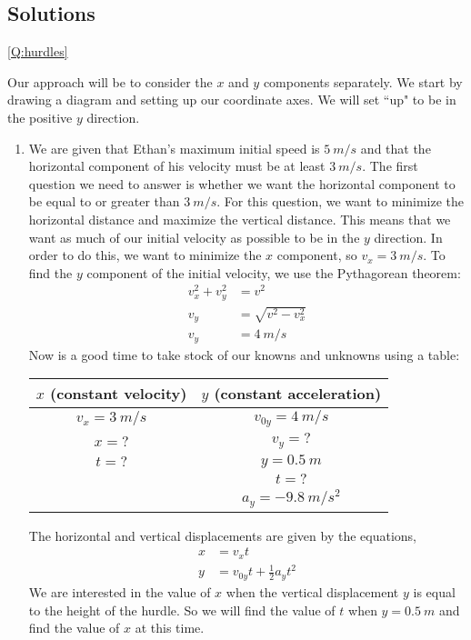 \subsection{Solutions}
\begin{solution}{\ref{Q:hurdles}}{
Our approach will be to consider the $x$ and $y$ components separately. We start by drawing a diagram and setting up our coordinate axes. We will set ``up" to be in the positive $y$ direction.
\begin{enumerate}[label=\alph*)]
\item We are given that Ethan's maximum initial speed is $\SI{5}{m/s}$ and that the horizontal component of his velocity must be at least $\SI{3}{m/s}$. The first question we need to answer is whether we want the horizontal component to be equal to or greater than $\SI{3}{m/s}$. For this question, we want to minimize the horizontal distance and maximize the vertical distance. This means that we want as much of our initial velocity as possible to be in the $y$ direction. In order to do this, we want to minimize the $x$ component, so $v_x=\SI{3}{m/s}$. To find the $y$ component of the initial velocity, we use the Pythagorean theorem: 
\begin{align*}
v_x^2+v_y^2&=v^2\\
v_y&=\sqrt{v^2-v_x^2}\\
v_y&=\SI{4}{m/s}
\end{align*}
Now is a good time to take stock of our knowns and unknowns using a table:
\begin{table}[H]
\centering
\label{KnownsUnknownsHurdleProb}
\begin{tabular}{|c|c|}
\hline
\textbf{$x$} (constant velocity)          & \textbf{$y$}  (constant acceleration) \\ \hline
$v_x = \SI{3}{m/s}$          & $v_{0y} = \SI{4}{m/s}$   \\
$x = ?$   & $v_{y} = ?$ \\
$t = ?$ & $y = \SI{0.5}{m}$  \\
                   & $t = ?$                    \\
                 & $a_y = \SI{-9.8}{m/s^2}$                 
\end{tabular}
\end{table}
The horizontal and vertical displacements are given by the equations,
\begin{align*}
x&=v_{x}t\\
y&=v_{0y}t+\frac{1}{2}a_yt^2
\end{align*}
We are interested in the value of $x$ when the vertical displacement $y$ is equal to the height of the hurdle. So we will find the value of $t$ when $y=\SI{0.5}{m}$ and find the value of $x$ at this time.\\

\end{enumerate}}
\end{solution}
